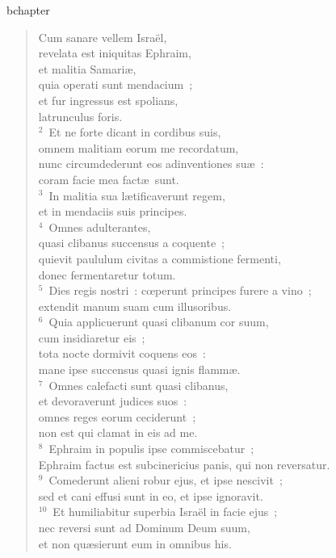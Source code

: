 bchapter\begin{verse}\vspace{-19pt}Cum sanare vellem Isra\"el,\\ revelata est iniquitas Ephraim,\\ et malitia Samari\ae ,\\ quia operati sunt mendacium~;\\ et fur ingressus est spolians,\\ latrunculus foris.\\
${}^{2}$~Et ne forte dicant in cordibus suis,\\ omnem malitiam eorum me recordatum,\\ nunc circumdederunt eos adinventiones su\ae~:\\ coram facie mea fact\ae\ sunt.\\
${}^{3}$~In malitia sua l\ae tificaverunt regem,\\ et in mendaciis suis principes.\\
${}^{4}$~Omnes adulterantes,\\ quasi clibanus succensus a coquente~;\\ quievit paululum civitas a commistione fermenti,\\ donec fermentaretur totum.\\
${}^{5}$~Dies regis nostri~: cœperunt principes furere a vino~;\\ extendit manum suam cum illusoribus.\\
${}^{6}$~Quia applicuerunt quasi clibanum cor suum,\\ cum insidiaretur eis~;\\ tota nocte dormivit coquens eos~:\\ mane ipse succensus quasi ignis flamm\ae .\\
${}^{7}$~Omnes calefacti sunt quasi clibanus,\\ et devoraverunt judices suos~:\\ omnes reges eorum ceciderunt~;\\ non est qui clamat in eis ad me.\\
${}^{8}$~Ephraim in populis ipse commiscebatur~;\\ Ephraim factus est subcinericius panis, qui non reversatur.\\
${}^{9}$~Comederunt alieni robur ejus, et ipse nescivit~;\\ sed et cani effusi sunt in eo, et ipse ignoravit.\\
${}^{10}$~Et humiliabitur superbia Isra\"el in facie ejus~;\\ nec reversi sunt ad Dominum Deum suum,\\ et non qu\ae sierunt eum in omnibus his.\\

\end{verse}
